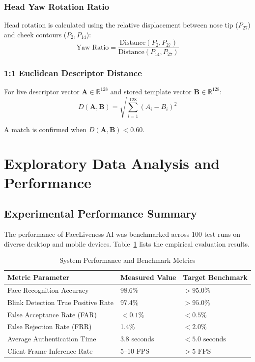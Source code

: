 \documentclass[12pt,a4paper,oneside]{article}
\begin{document}
\subsubsection{Head Yaw Rotation Ratio}
Head rotation is calculated using the relative displacement between nose tip ($P_{27}$) and cheek contours ($P_2, P_{14}$):
\begin{equation}
\text{Yaw Ratio} = \frac{\text{Distance}(P_2, P_{27})}{\text{Distance}(P_{14}, P_{27})}
\end{equation}

\subsubsection{1:1 Euclidean Descriptor Distance}
For live descriptor vector $\mathbf{A} \in \mathbb{R}^{128}$ and stored template vector $\mathbf{B} \in \mathbb{R}^{128}$:
\begin{equation}
D(\mathbf{A}, \mathbf{B}) = \sqrt{\sum_{i=1}^{128} (A_i - B_i)^2}
\end{equation}

A match is confirmed when $D(\mathbf{A}, \mathbf{B}) < 0.60$.

\section{Exploratory Data Analysis and Performance}
\label{sec:eda}

\subsection{Experimental Performance Summary}
The performance of FaceLiveness AI was benchmarked across 100 test runs on diverse desktop and mobile devices. Table~\ref{tab:performance_results} lists the empirical evaluation results.

\begin{table}[h!]
\centering
\renewcommand{\arraystretch}{1.3}
\caption{System Performance and Benchmark Metrics}
\label{tab:performance_results}
\begin{tabular}{|p{6.5cm}|p{4.2cm}|p{4.2cm}|}
\hline
\rowcolor{gray!15} \textbf{Metric Parameter} & \textbf{Measured Value} & \textbf{Target Benchmark} \\ \hline
Face Recognition Accuracy & 98.6\% & $> 95.0\%$ \\ \hline
Blink Detection True Positive Rate & 97.4\% & $> 95.0\%$ \\ \hline
False Acceptance Rate (FAR) & $< 0.1\%$ & $< 0.5\%$ \\ \hline
False Rejection Rate (FRR) & 1.4\% & $< 2.0\%$ \\ \hline
Average Authentication Time & 3.8 seconds & $< 5.0\text{ seconds}$ \\ \hline
Client Frame Inference Rate & 5--10 FPS & $> 5\text{ FPS}$ \\ \hline
\end{tabular}
\end{table}
\end{document}
